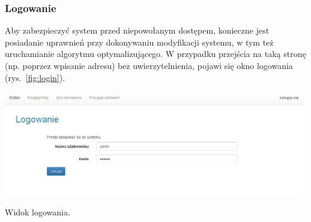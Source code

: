 \documentclass[11pt,a4paper,oneside]{mwart}
\begin{document}
\subsubsection{Logowanie}
Aby zabezpieczyć system przed niepowołanym dostępem, konieczne jest posiadanie uprawnień przy dokonywaniu modyfikacji systemu, w tym też uruchamianie algorytmu optymalizującego. W przypadku przejścia na taką stronę (np. poprzez wpisanie adresu) bez uwierzytelnienia, pojawi się okno logowania (rys.~\ref{fig:login}). 

\begin{wykres}[htbp]
  \centering
  \includegraphics[width=0.99\textwidth]{pics/login.png}
  \caption{Widok logowania.}
  \label{fig:login}
\end{wykres}
\end{document}
